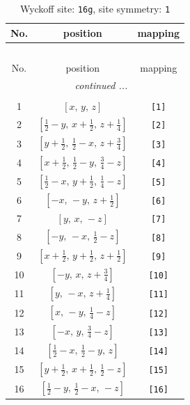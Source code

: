 \documentclass[fleqn,8pt]{jsarticle}
\begin{document}
\begin{longtable}{ccc}
\caption{Wyckoff site: {\tt 16g}, site symmetry: {\tt 1}}
 \\
 \hline \hline
No. & position & mapping \\ \hline \endfirsthead

\multicolumn{2}{l}{\tablename\ \thetable{}} \\
 \hline \hline
No. & position & mapping \\ \hline \endhead

 \hline \hline
\multicolumn{2}{r}{\footnotesize\it continued ...} \\ \endfoot

 \hline \hline
\multicolumn{2}{r}{} \\ \endlastfoot

1 & $\left[ x,\, y,\, z \right]$ & {\tt [1]} \\ \hline
2 & $\left[ \frac{1}{2} - y,\, x + \frac{1}{2},\, z + \frac{1}{4} \right]$ & {\tt [2]} \\ \hline
3 & $\left[ y + \frac{1}{2},\, \frac{1}{2} - x,\, z + \frac{3}{4} \right]$ & {\tt [3]} \\ \hline
4 & $\left[ x + \frac{1}{2},\, \frac{1}{2} - y,\, \frac{3}{4} - z \right]$ & {\tt [4]} \\ \hline
5 & $\left[ \frac{1}{2} - x,\, y + \frac{1}{2},\, \frac{1}{4} - z \right]$ & {\tt [5]} \\ \hline
6 & $\left[ - x,\, - y,\, z + \frac{1}{2} \right]$ & {\tt [6]} \\ \hline
7 & $\left[ y,\, x,\, - z \right]$ & {\tt [7]} \\ \hline
8 & $\left[ - y,\, - x,\, \frac{1}{2} - z \right]$ & {\tt [8]} \\ \hline
9 & $\left[ x + \frac{1}{2},\, y + \frac{1}{2},\, z + \frac{1}{2} \right]$ & {\tt [9]} \\ \hline
10 & $\left[ - y,\, x,\, z + \frac{3}{4} \right]$ & {\tt [10]} \\ \hline
11 & $\left[ y,\, - x,\, z + \frac{1}{4} \right]$ & {\tt [11]} \\ \hline
12 & $\left[ x,\, - y,\, \frac{1}{4} - z \right]$ & {\tt [12]} \\ \hline
13 & $\left[ - x,\, y,\, \frac{3}{4} - z \right]$ & {\tt [13]} \\ \hline
14 & $\left[ \frac{1}{2} - x,\, \frac{1}{2} - y,\, z \right]$ & {\tt [14]} \\ \hline
15 & $\left[ y + \frac{1}{2},\, x + \frac{1}{2},\, \frac{1}{2} - z \right]$ & {\tt [15]} \\ \hline
16 & $\left[ \frac{1}{2} - y,\, \frac{1}{2} - x,\, - z \right]$ & {\tt [16]} \\
\end{longtable}
\end{document}
